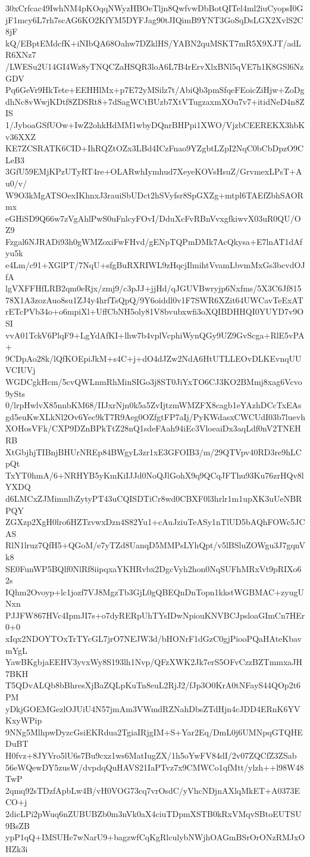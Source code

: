30xCrfcac49IwhNM4pKOqqNWyzHBOeTljn8QwfvwDbBotQITel4ml2iuCyopsI0G
jF1mcy6L7rh7scAG6KO2KfYM5DYFJag90tJIQimB9YNT3GoSqDsLGX2XvlS2C8jF
kQ/EBptEMdcfK+iNIbQA68Oahw7DZklHS/YABN2quMSKT7mR5X9XJT/adLR6XNz7
/LWESu2U14GI4Wz8yTNQCZaHSQR3loA6L7B4rErvXlxBNl5qVE7h1K8GSl6NzGDV
Pq6GeVr9HkTete+EEHHlMx+p7E72yMSilz7t/AbiQb3pmSfqeFEoicZiHjw+ZoDg
dhNc8vWwjKDtf8ZDSRt8+7dSagWCtBUzb7XtVTugzaxmXOu7v7+itidNeD4n8ZIS
1/JyboaGSfUOw+IwZ2ohkHdMM1wbyDQnrBHPpi1XWO/VjzbCEEREKX3hbKv36XXZ
KE7ZCSRATK6CID+IhRQZtOZx3LBd4ICzFnao9YZgbtLZpI2NqC0bCbDpzO9CLeB3
3GfU59EMjKPzUTyRT4re+OLARwhIymhud7XeyeKOVsHsuZ/GrvmexLPsT+Au0/v/
W9O3kMgATSOexIKhnxJ3rauiSbUDct2hSVyfsr8SpGXZg+mtpl6TAEfZbhSAORmx
eGHiSD9Q66w7zVgAhlPwS0uFnlcyFOvI/DduXcFvRBnVvxgfkiwvX03uR0QU/OZ9
Fzgal6NJRADi93h0gWMZoxiFwFHvd/gENpTQPmDMk7AcQkysa+E7lnAT1dAfyu5k
e4Lm/c91+XGlPT/7NqU+sfgBuRXRIWL9zHqcjIlmihtVvamLbvmMxGs3bcvdOJfA
lgVXFFHfLRB2qm0eRjx/zmj9/c3pJJ+jjHd/qJGUVBwryjp6Nxfms/5X3C6Jf815
78X1A3zozAuo8su1ZJ4y4hrfTsQpQ/9Y6oiddl0v1F7SWR6XZit64UWCavTeExAT
rETcPVb34o+o6mpiXl+UffCbNH5oly81V8bvubxwfi3oXQIBDHHQI0YUYD7v9OSI
vvA01TckV6PlqF9+LgYdAfKI+lhw7b4vplVcphiWynQGy9UZ9GvScga+RlE5vPA+
9CDpAo28k/lQfKOEpiJkM+s4C+j+dO4dJZw2NdA6HtUTLLEOvDLKEvnqUUVCIUVj
WGDCgkHcm/5cvQWLnmRhMinSIGo3j8ST0JiYxTO6CJ3KO2BMmj8xag6Vcvo9ySts
0/lrpHwlvX85nnbKM68/IIJxrNjn0k5a5ZvIjtzmWMZFX8cagb1eYAzhDCcTxEAs
gd5euKwXLkNl2Ov6Yec9kT7R9Aeg0OZfgtFP7aIj/PyKWdasxCWCUdI03b7luevh
XOHosVFk/CXP9DZnBPkTtZ28nQ1sdeFAah94iEc3VloeaiDx3aqLdf0nV2TNEHRB
XtGbjhjTIBnjBHUrNREp84BWgyL3zr1xE3GFOIB3/m/29QTVpv40RD3re9hLCpQt
TxYT0hmA/6+NRHYB5yKmKiIJJd0NoQJlGohX9q9QCqJFThu93Ku76zrHQv8lYXDQ
d6LMCxZJMimnlbZytyPT43uCQISDTiCr8wd0CBXF0l3hrlr1m1upXK3uUeNBRPQY
ZGXzp2XgH0lro6HZTzvwxDzn4S82Yu1+cAuJziuTeASy1nTlUD5bAQhFOWc5JCAS
RlN1lruz7QfH5+QGoM/e7yTZd8UanqD5MMPsLYhQpt/v5lBSluZOWgu3J7gqnVk8
SE0FunWP5BQlf0NlRf8iipqxaYKHRvbx2DgcVyh2hon0NqSUFhMRxVt9pRIXo62s
IQhm2Ovoyp+lc1jozf7VJ8MgzTb3GjL0gQBEQnDnTopn1kkstWGBMAC+zyugUNxn
PJJFW867HVc4IpmJI7s+o7dyRERpUhTYsIDwNpiouKNVBCJpsloaGImCn7HEr0+0
xIqx2NDOYTOxTrTYcGL7jrO7NEJW3d/bHONrF1dGzC0gjPiooPQaHAteKbavmYgL
YawBKgbjaEEHV3yvxWy8S193lh1Nvp/QFzXWK2Jk7erS5OFvCzzBZTmmxaJH7BKH
T5QDvALQb8bBhresXjBaZQLpKuTn8euL2RjJ2/fJp3O0KrA0tNFayS44QOp2t6PM
yDkjGOEMGezlOJUiU4N57jmAm3VWmdRZNahDbsZTdHjn4cJDD4ERnK6YVKxyWPip
9NNg5MlhpwDyzcGsiEKRdua2TgiaIRjgIM+S+Yar2Eq/DmL0j6UMNpqGTQHEDuBT
H0fvz+8JYVro5lU6s7Bu9cxz1ws6MatIugZX/1h5oYwFV84dI/2v07ZQCfZ3ZSab
56eWQewDY5zusW/dvpdqQuHAVS21IaPTvz7x9CMWCo1qfMtt/ylzh++l98W48TwP
2qmq92sTDzfApbLw4B/vH0VOG73cq7vrOsdC/yVhcNDjnAXlqMkET+A0373ECO+j
2dicLPi2pWuq6nZUBUBZb0m3nVk0aX4ciuTDpmXSTB0kRxVMqvSBtoEUTSU9BsZB
ypP1qQ+IMSUHc7wNarU9+bagzwfCqKgRlculybNWjhOAGmBSrOrONzRMJxOHZk3i
